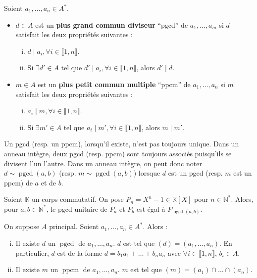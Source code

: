 	\begin{definition}
		Soient $a_1, \dots, a_n \in A^*$.
		\begin{itemize}
			\item $d \in A$ est un \textbf{plus grand commun diviseur} ``pgcd'' de $a_1, \dots, a_m$ si $d$ satisfait les deux propriétés suivantes :
			\begin{enumerate}[(i)]
				\item $d \mid a_i, \forall i \in \llbracket 1, n \rrbracket$.
				\item Si $\exists d' \in A$ tel que $d' \mid a_i, \forall i \in \llbracket 1, n \rrbracket$, alors $d' \mid d$.
			\end{enumerate}
			\item $m \in A$ est un \textbf{plus petit commun multiple} ``ppcm'' de $a_1, \dots, a_n$ si $m$ satisfait les deux propriétés suivantes :
			\begin{enumerate}[(i)]
				\item $a_i \mid m, \forall i \in \llbracket 1, n \rrbracket$.
				\item Si $\exists m' \in A$ tel que $a_i \mid m', \forall i \in \llbracket 1, n \rrbracket$, alors $m \mid m'$.
			\end{enumerate}
		\end{itemize}
	\end{definition}
	
	\begin{remark}
		Un pgcd (resp. un ppcm), lorsqu'il existe, n'est pas toujours unique. Dans un anneau intègre, deux pgcd (resp. ppcm) sont toujours associés puisqu'ils se divisent l'un l'autre. Dans un anneau intègre, on peut donc noter $d \sim \operatorname{pgcd}(a, b)$ (resp. $m \sim \operatorname{pgcd}(a, b)$) lorsque $d$ est un pgcd (resp. $m$ est un ppcm) de $a$ et de $b$.
	\end{remark}
	
	
	\begin{example}
		Soient $\mathbb{K}$ un corps commutatif. On pose $P_n = X^n - 1 \in \mathbb{K}[X]$ pour $n \in \mathbb{N}^*$. Alors, pour $a, b \in \mathbb{N}^*$, le pgcd unitaire de $P_a$ et $P_b$ est égal à $P_{\operatorname{pgcd}(a,b)}$.
	\end{example}
	
	
	\begin{theorem}
		On suppose $A$ principal. Soient $a_1, \dots, a_n \in A^*$. Alors :
		\begin{enumerate}[(i)]
			\item Il existe $d$ un $\operatorname{pgcd}$ de $a_1, \dots, a_n$. $d$ est tel que $(d) = (a_1, \dots, a_n)$. En particulier, $d$ est de la forme $d = b_1 a_1 + \dots + b_n a_n$ avec $\forall i \in \llbracket 1, n \rrbracket, \, b_i \in A$.
			\item Il existe $m$ un $\operatorname{ppcm}$ de $a_1, \dots, a_n$. $m$ est tel que $(m) = (a_1) \cap \dots \cap (a_n)$.
		\end{enumerate}
	\end{theorem}
	
